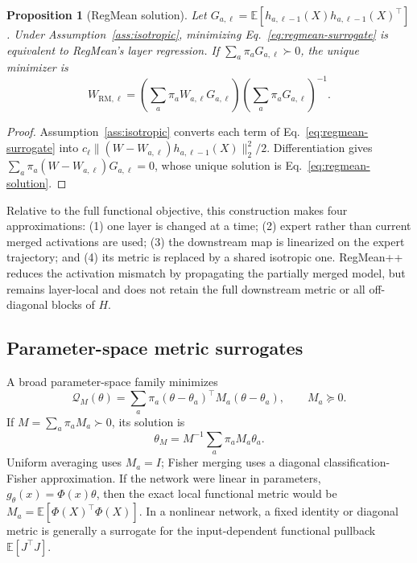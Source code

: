 \documentclass[letterpaper]{article} %
\theoremstyle{plain}
\newtheorem{proposition}[theorem]{Proposition}
\theoremstyle{definition}
\begin{document}
\begin{proposition}[RegMean solution]
\label{prop:regmean-formal}
Let $G_{a,\ell}=\mathbb E[h_{a,\ell-1}(X)h_{a,\ell-1}(X)^\top]$.
Under Assumption~\ref{ass:isotropic}, minimizing Eq.~\eqref{eq:regmean-surrogate} is equivalent to RegMean's layer regression.
If $\sum_a\pi_aG_{a,\ell}\succ0$, the unique minimizer is
\begin{equation}
W_{\mathrm{RM},\ell}
=\left(\sum_a\pi_aW_{a,\ell}G_{a,\ell}\right)
 \left(\sum_a\pi_aG_{a,\ell}\right)^{-1}.
\label{eq:regmean-solution}
\end{equation}
\end{proposition}

\begin{proof}
Assumption~\ref{ass:isotropic} converts each term of Eq.~\eqref{eq:regmean-surrogate} into $c_\ell\|(W-W_{a,\ell})h_{a,\ell-1}(X)\|_2^2/2$.
Differentiation gives $\sum_a\pi_a(W-W_{a,\ell})G_{a,\ell}=0$, whose unique solution is Eq.~\eqref{eq:regmean-solution}.
\end{proof}

Relative to the full functional objective, this construction makes four approximations: (1) one layer is changed at a time; (2) expert rather than current merged activations are used; (3) the downstream map is linearized on the expert trajectory; and (4) its metric is replaced by a shared isotropic one.
RegMean++ reduces the activation mismatch by propagating the partially merged model, but remains layer-local and does not retain the full downstream metric or all off-diagonal blocks of $H$.

\subsection{Parameter-space metric surrogates}
\label{app:parameter-metrics}

A broad parameter-space family minimizes
\begin{equation}
\mathcal Q_M(\theta)=
\sum_a\pi_a(\theta-\theta_a)^\top M_a(\theta-\theta_a),
\qquad M_a\succeq0.
\label{eq:parameter-metric}
\end{equation}
If $M=\sum_a\pi_aM_a\succ0$, its solution is
\begin{equation}
\theta_M=M^{-1}\sum_a\pi_aM_a\theta_a.
\label{eq:parameter-metric-solution}
\end{equation}
Uniform averaging uses $M_a=I$; Fisher merging uses a diagonal classification-Fisher approximation.
If the network were linear in parameters, $g_\theta(x)=\Phi(x)\theta$, then the exact local functional metric would be $M_a=\mathbb E[\Phi(X)^\top\Phi(X)]$.
In a nonlinear network, a fixed identity or diagonal metric is generally a surrogate for the input-dependent functional pullback $\mathbb E[J^\top J]$.
\end{document}
